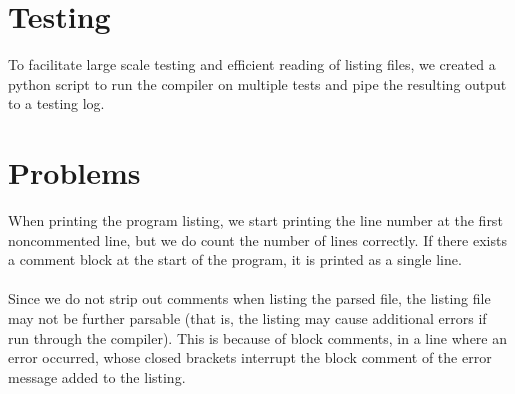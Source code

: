 \documentclass{report}
\begin{document}
\section*{Testing}
To facilitate large scale testing and efficient reading of listing files, we created a python script to run the compiler on multiple tests and pipe the resulting output to a testing log.


\section*{Problems}
When printing the program listing, we start printing the line number at the first noncommented line, but we do count the number of lines correctly. If there exists a comment block at the start of the program, it is printed as a single line.
\\
\\
Since we do not strip out comments when listing the parsed file, the listing file may not be further parsable (that is, the listing may cause additional errors if run through the compiler). This is because of block comments, in a line where an error occurred, whose closed brackets interrupt the block comment of the error message added to the listing.
\end{document}
